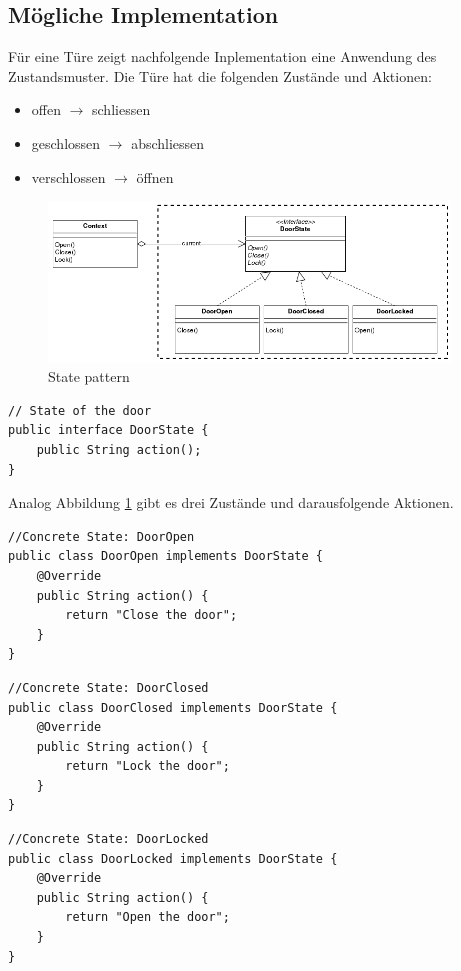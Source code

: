 \documentclass[10pt,a4paper]{article}
\begin{document}
\subsection*{Mögliche Implementation}
%
Für eine Türe zeigt nachfolgende Inplementation eine Anwendung des Zustandsmuster. Die Türe hat die folgenden Zustände und Aktionen:
%
\begin{itemize}
  \item offen $\rightarrow$ schliessen
  \item geschlossen $\rightarrow$  abschliessen
  \item verschlossen $\rightarrow$ öffnen
\end{itemize}
%
\begin{figure}[H]
  \begin{center}
    \includegraphics[width=0.95\textwidth]{state-pattern02.png}
    \caption{State pattern}
    \label{fig:door-state}
  \end{center}
\end{figure}
%
\begin{lstlisting}[caption={Interface}]
// State of the door
public interface DoorState {
	public String action();
}
\end{lstlisting}
%
Analog Abbildung \ref{fig:door-state} gibt es drei Zustände und darausfolgende Aktionen.
%
\begin{lstlisting}[caption={Zustand: Türe geöffnet}]
//Concrete State: DoorOpen
public class DoorOpen implements DoorState {
	@Override
	public String action() {
		return "Close the door";
	}
}
\end{lstlisting}
%
\begin{lstlisting}[caption={Zustand: Türe geschlossen}]
//Concrete State: DoorClosed
public class DoorClosed implements DoorState {
	@Override
	public String action() {
		return "Lock the door";
	}
}
\end{lstlisting}
%
\begin{lstlisting}[caption={Zustand: Türe verschlossen}]
//Concrete State: DoorLocked
public class DoorLocked implements DoorState {
	@Override
	public String action() {
		return "Open the door";
	}
}
\end{lstlisting}
\end{document}

